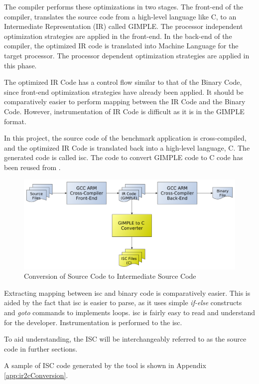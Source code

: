 The compiler performs these optimizations in two stages. The front-end of the compiler, translates the source code from a high-level language like C, to an Intermediate Representation (IR) called GIMPLE. The processor independent optimization strategies are applied in the front-end. In the back-end of the compiler, the optimized IR code is translated into Machine Language for the target processor. The processor dependent optimization strategies are applied in this phase.

The optimized IR Code has a control flow similar to that of the Binary Code, since front-end optimization strategies have already been applied. It should be comparatively easier to perform mapping between the IR Code and the Binary Code. However, instrumentation of IR Code is difficult as it is in the GIMPLE format. 

In this project, the source code of the benchmark application is cross-compiled, and the optimized IR Code is translated back into a high-level language, C. The generated code is called \gls{isc}. The code to convert GIMPLE code to C code has been reused from \cite{RBA2013}.

\begin{figure}[h]
\centering
\includegraphics[width=.9\textwidth]{figures/ir2cConversion.pdf}
\caption{Conversion of Source Code to Intermediate Source Code}
\label{fig:ir2cConversion}
\end{figure}

Extracting mapping between \gls{isc} and binary code is comparatively easier. This is aided by the fact that \gls{isc} is easier to parse, as it uses simple \emph{if-else} constructs and \emph{goto} commands to implements loops. \gls{isc} is fairly easy to read and understand for the developer. Instrumentation is performed to the \gls{isc}. 

To aid understanding, the ISC will be interchangeably referred to as the source code in further sections.

A sample of ISC code generated by the tool is shown in Appendix \ref{app:ir2cConversion}.

